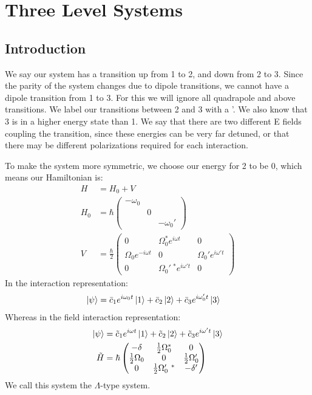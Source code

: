\section{Three Level Systems}
\subsection{Introduction}
We say our system has a transition up from 1 to 2, and down from 2 to 3. Since the parity of the system changes due to dipole transitions, we cannot have a dipole transition from 1 to 3. 
For this we will ignore all quadrapole and above transitions. We label our transitions between 2 and 3 with a '. We also know that 3 is in a higher energy state than 1.
We say that there are two different E fields coupling the transition, since these energies can be very far detuned, or that there may be different polarizations required for each interaction.

To make the system more symmetric, we choose our energy for 2 to be 0, which means our Hamiltonian is:
\begin{align*}
	H &= H_0 + V \\
	H_0 &= \hbar \begin{pmatrix}
		-\omega_0 & & \\
			  & 0& \\
			  && -\omega_0'
		     \end{pmatrix}\\
	V &= \frac{\hbar}{2} \begin{pmatrix}
		0 & \Omega_0^* e^{i\omega t} & 0 \\
		\Omega_0 e^{-i\omega t} & 0 & \Omega_0' e^{i\omega' t} \\
		0 & \Omega_0'\ ^* e^{i\omega' t} & 0
			     \end{pmatrix}
\end{align*}
In the interaction representation:
\begin{align*}
	\ket{\psi} &= \bar{c}_1 e^{i\omega_0 t} \ket{1} + \bar{c}_2\ket{2} + \bar{c}_3 e^{i\omega_0' t}\ket{3}
\end{align*}
Whereas in the field interaction representation:
\begin{align*}
	\ket{\psi} &= \tilde{c}_1 e^{i\omega t} \ket{1} + \tilde{c}_2\ket{2} + \tilde{c}_3 e^{i\omega' t}\ket{3} \\
	\tilde{H} &= \hbar \begin{pmatrix}
		-\delta & \frac{1}{2}\Omega_0^* & 0 \\
		\frac{1}{2}\Omega_0 & 0 & \frac{1}{2}\Omega_0' \\
		0	&\frac{1}{2}\Omega_0'\ ^*   & -\delta'
			   \end{pmatrix}
\end{align*}
We call this system the $\Lambda$-type system.
